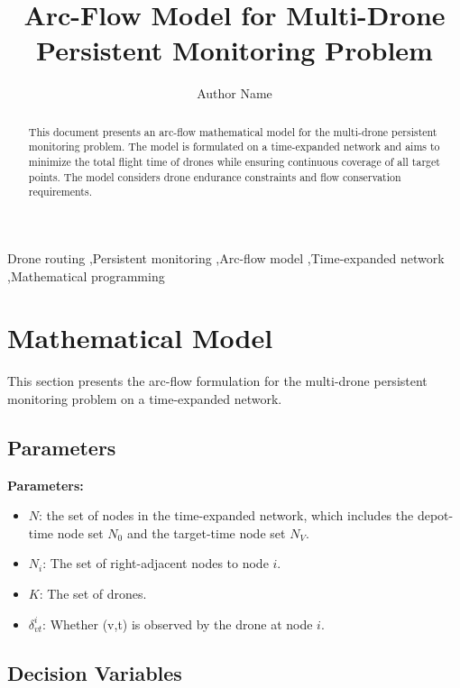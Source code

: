 \documentclass[preprint,review,12pt,3p,authoryear]{elsarticle}
\begin{document}
\begin{frontmatter}

\title{Arc-Flow Model for Multi-Drone Persistent Monitoring Problem}

\author[inst1]{Author Name}

\address[inst1]{Department/Institution, City, Country}

\begin{abstract}
This document presents an arc-flow mathematical model for the multi-drone persistent monitoring problem. The model is formulated on a time-expanded network and aims to minimize the total flight time of drones while ensuring continuous coverage of all target points. The model considers drone endurance constraints and flow conservation requirements.
\end{abstract}

\begin{keyword}
Drone routing \sep Persistent monitoring \sep Arc-flow model \sep Time-expanded network \sep Mathematical programming
\end{keyword}

\end{frontmatter}

\section{Mathematical Model}

This section presents the arc-flow formulation for the multi-drone persistent monitoring problem on a time-expanded network.

\subsection{Parameters}

\textbf{Parameters:}
\begin{itemize}
    \item $N$: the set of nodes in the time-expanded network, which includes the depot-time node set $N_0$ and the target-time node set $N_V$.
    \item $N_i$: The set of right-adjacent nodes to node $i$.
    \item $K$: The set of drones.
    \item $\delta_{vt}^i$: Whether (v,t) is observed by the drone at node $i$.
\end{itemize}

\subsection{Decision Variables}
\end{document}
